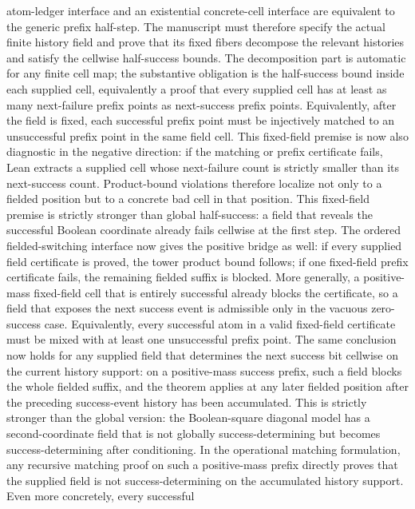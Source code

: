 \documentclass[11pt]{article}
\theoremstyle{remark}
\begin{document}
\begin{enumerate}[leftmargin=1.5em]
  atom-ledger interface and an existential concrete-cell interface are equivalent to the generic
  prefix half-step.  The manuscript must therefore specify the actual finite history field and
  prove that its fixed fibers decompose the relevant histories and satisfy the cellwise
  half-success bounds.  The decomposition part is automatic for any finite cell map; the
  substantive obligation is the half-success bound inside each supplied cell, equivalently a
  proof that every supplied cell has at least as many next-failure prefix points as next-success
  prefix points.  Equivalently, after the field is fixed, each successful prefix point must be
  injectively matched to an unsuccessful prefix point in the same field cell.  This fixed-field
  premise is now also diagnostic in the negative direction: if the matching or prefix certificate
  fails, Lean extracts a supplied cell whose next-failure count is strictly smaller than its
  next-success count.  Product-bound violations therefore localize not only to a fielded position
  but to a concrete bad cell in that position.  This fixed-field premise is strictly stronger than
  global half-success:
  a field that reveals the successful Boolean coordinate already fails cellwise at the first step.
  The ordered fielded-switching interface now gives the positive bridge as well: if every supplied
  field certificate is proved, the tower product bound follows; if one fixed-field prefix
  certificate fails, the remaining fielded suffix is blocked.
  More generally, a positive-mass fixed-field cell that is entirely successful already blocks the
  certificate, so a field that exposes the next success event is admissible only in the vacuous
  zero-success case.  Equivalently, every successful atom in a valid fixed-field certificate must
  be mixed with at least one unsuccessful prefix point.  The same conclusion now holds for any
  supplied field that determines the next success bit cellwise on the current history support: on a
  positive-mass success prefix, such a field blocks the whole fielded suffix, and the theorem
  applies at any later fielded position after the preceding success-event history has been
  accumulated.  This is strictly stronger than the global version: the Boolean-square diagonal
  model has a second-coordinate field that is not globally success-determining but becomes
  success-determining after conditioning.  In the operational matching formulation, any recursive
  matching proof on such a positive-mass prefix directly proves that the supplied field is not
  success-determining on the accumulated history support.  Even more concretely, every successful

\end{enumerate}
\end{document}
